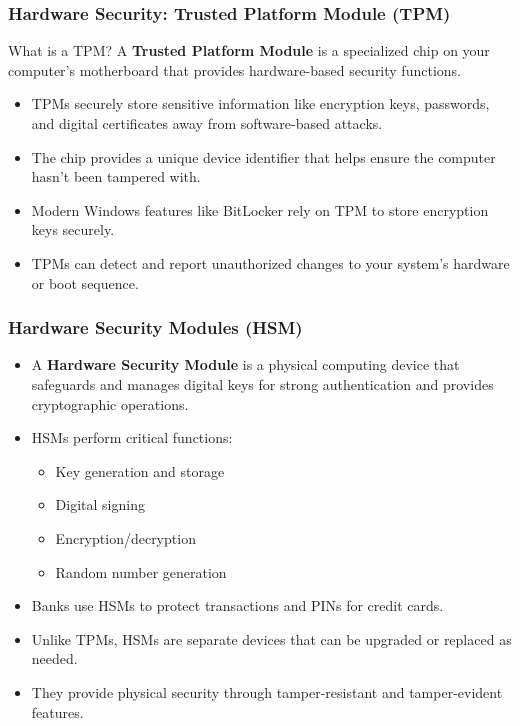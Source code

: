 \documentclass{beamer}
\begin{document}
\begin{frame}
    \frametitle{Hardware Security: Trusted Platform Module (TPM)}
    
    \begin{block}{What is a TPM?}
        A \textbf{Trusted Platform Module} is a specialized chip on your computer's motherboard that provides hardware-based security functions.
    \end{block}
    
    \begin{itemize}
        \item TPMs securely store sensitive information like encryption keys, passwords, and digital certificates away from software-based attacks.
        
        \item The chip provides a unique device identifier that helps ensure the computer hasn't been tampered with.
        
        \item Modern Windows features like BitLocker rely on TPM to store encryption keys securely.
        
        \item TPMs can detect and report unauthorized changes to your system's hardware or boot sequence.
    \end{itemize}
\end{frame}

\begin{frame}
    \frametitle{Hardware Security Modules (HSM)}
    
    \begin{itemize}
        \item A \textbf{Hardware Security Module} is a physical computing device that safeguards and manages digital keys for strong authentication and provides cryptographic operations.
        
        \item HSMs perform critical functions:
            \begin{itemize}
                \item Key generation and storage
                \item Digital signing
                \item Encryption/decryption
                \item Random number generation
            \end{itemize}
        
        \item Banks use HSMs to protect transactions and PINs for credit cards.
        
        \item Unlike TPMs, HSMs are separate devices that can be upgraded or replaced as needed.
        
        \item They provide physical security through tamper-resistant and tamper-evident features.
    \end{itemize}
\end{frame}
\end{document}
